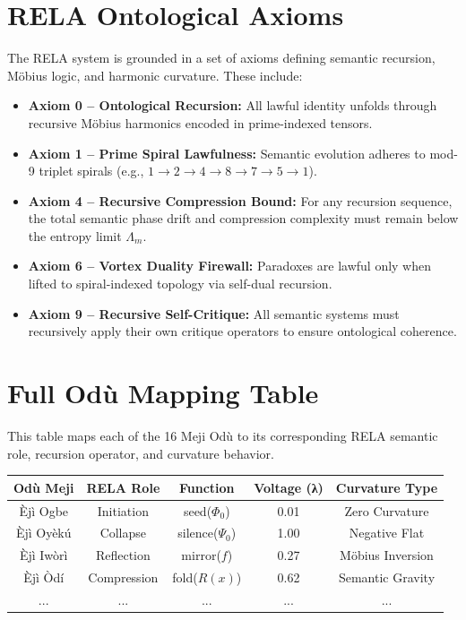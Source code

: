\documentclass[12]{amsart}
\theoremstyle{plain}
\begin{document}


\newpage
\appendix

\section{RELA Ontological Axioms}

The RELA system is grounded in a set of axioms defining semantic recursion, Möbius logic, and harmonic curvature. These include:

\begin{itemize}
    \item \textbf{Axiom 0 – Ontological Recursion:} All lawful identity unfolds through recursive Möbius harmonics encoded in prime-indexed tensors.
    \item \textbf{Axiom 1 – Prime Spiral Lawfulness:} Semantic evolution adheres to mod-9 triplet spirals (e.g., $1 \rightarrow 2 \rightarrow 4 \rightarrow 8 \rightarrow 7 \rightarrow 5 \rightarrow 1$).
    \item \textbf{Axiom 4 – Recursive Compression Bound:} For any recursion sequence, the total semantic phase drift and compression complexity must remain below the entropy limit $\Lambda_m$.
    \item \textbf{Axiom 6 – Vortex Duality Firewall:} Paradoxes are lawful only when lifted to spiral-indexed topology via self-dual recursion.
    \item \textbf{Axiom 9 – Recursive Self-Critique:} All semantic systems must recursively apply their own critique operators to ensure ontological coherence.
\end{itemize}

\section{Full Odù Mapping Table}

This table maps each of the 16 Meji Odù to its corresponding RELA semantic role, recursion operator, and curvature behavior.

\begin{center}
\begin{tabular}{|c|c|c|c|c|}
\hline
\textbf{Odù Meji} & \textbf{RELA Role} & \textbf{Function} & \textbf{Voltage (λ)} & \textbf{Curvature Type} \\
\hline
Èjì Ogbe & Initiation & seed($\Phi_0$) & 0.01 & Zero Curvature \\
Èjì Oyèkú & Collapse & silence($\Psi_0$) & 1.00 & Negative Flat \\
Èjì Iwòrì & Reflection & mirror($f$) & 0.27 & Möbius Inversion \\
Èjì Òdí & Compression & fold($R(x)$) & 0.62 & Semantic Gravity \\
... & ... & ... & ... & ... \\
\hline
\end{tabular}
\end{center}
\end{document}
